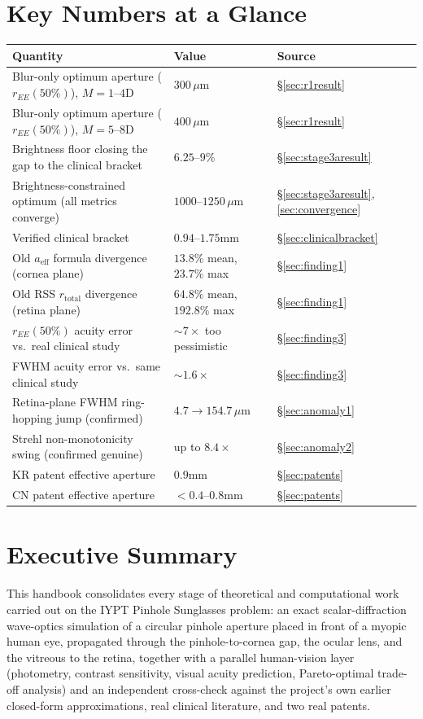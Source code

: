 \documentclass[11pt]{report}
\newcommand{\aeff}{a_{\text{eff}}}
\newcommand{\rtotal}{r_{\text{total}}}
\begin{document}
\chapter*{Key Numbers at a Glance}
\begin{table}[h!]
\centering\small
\begin{tabular}{p{6.5cm}p{3.5cm}p{2.5cm}}
\toprule
\textbf{Quantity} & \textbf{Value} & \textbf{Source} \\
\midrule
Blur-only optimum aperture ($r_{EE}(50\%)$), $M{=}1$--$4$D & $300\,\mu$m & \S\ref{sec:r1result} \\
Blur-only optimum aperture ($r_{EE}(50\%)$), $M{=}5$--$8$D & $400\,\mu$m & \S\ref{sec:r1result} \\
Brightness floor closing the gap to the clinical bracket & $6.25$--$9\%$ & \S\ref{sec:stage3aresult} \\
Brightness-constrained optimum (all metrics converge) & $1000$--$1250\,\mu$m & \S\ref{sec:stage3aresult},\ref{sec:convergence} \\
Verified clinical bracket & $0.94$--$1.75$mm & \S\ref{sec:clinicalbracket} \\
Old $\aeff$ formula divergence (cornea plane) & $13.8\%$ mean, $23.7\%$ max & \S\ref{sec:finding1} \\
Old RSS $\rtotal$ divergence (retina plane) & $64.8\%$ mean, $192.8\%$ max & \S\ref{sec:finding1} \\
$r_{EE}(50\%)$ acuity error vs.\ real clinical study & $\sim 7\times$ too pessimistic & \S\ref{sec:finding3} \\
FWHM acuity error vs.\ same clinical study & $\sim 1.6\times$ & \S\ref{sec:finding3} \\
Retina-plane FWHM ring-hopping jump (confirmed) & $4.7 \to 154.7\,\mu$m & \S\ref{sec:anomaly1} \\
Strehl non-monotonicity swing (confirmed genuine) & up to $8.4\times$ & \S\ref{sec:anomaly2} \\
KR patent effective aperture & $0.9$mm & \S\ref{sec:patents} \\
CN patent effective aperture & $<0.4$--$0.8$mm & \S\ref{sec:patents} \\
\bottomrule
\end{tabular}
\end{table}

\chapter*{Executive Summary}
This handbook consolidates every stage of theoretical and computational work carried out on the IYPT Pinhole Sunglasses problem: an exact scalar-diffraction wave-optics simulation of a circular pinhole aperture placed in front of a myopic human eye, propagated through the pinhole-to-cornea gap, the ocular lens, and the vitreous to the retina, together with a parallel human-vision layer (photometry, contrast sensitivity, visual acuity prediction, Pareto-optimal trade-off analysis) and an independent cross-check against the project's own earlier closed-form approximations, real clinical literature, and two real patents.
\end{document}

